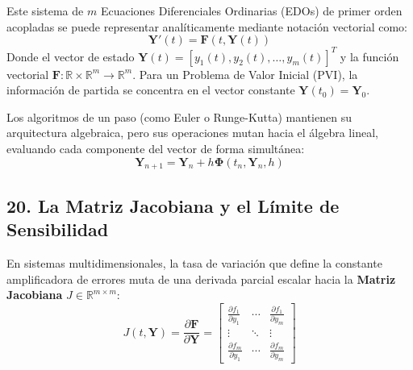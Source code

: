 \documentclass[12pt]{article}
\begin{document}
Este sistema de $m$ Ecuaciones Diferenciales Ordinarias (EDOs) de primer orden acopladas se puede representar analíticamente mediante notación vectorial como:
\begin{equation}
    \mathbf{Y}'(t) = \mathbf{F}(t, \textbf{Y}(t))
\end{equation}
Donde el vector de estado $\mathbf{Y}(t) = [y_1(t), y_2(t), \dots, y_m(t)]^T$ y la función vectorial $\mathbf{F}: \mathbb{R} \times \mathbb{R}^m \to \mathbb{R}^m$. Para un Problema de Valor Inicial (PVI), la información de partida se concentra en el vector constante $\mathbf{Y}(t_0) = \mathbf{Y}_0$.

Los algoritmos de un paso (como Euler o Runge-Kutta) mantienen su arquitectura algebraica, pero sus operaciones mutan hacia el álgebra lineal, evaluando cada componente del vector de forma simultánea:
\begin{equation}
    \mathbf{Y}_{n+1} = \mathbf{Y}_n + h \mathbf{\Phi}(t_n, \mathbf{Y}_n, h)
\end{equation}

\subsection*{20. La Matriz Jacobiana y el Límite de Sensibilidad}
En sistemas multidimensionales, la tasa de variación que define la constante amplificadora de errores muta de una derivada parcial escalar hacia la \textbf{Matriz Jacobiana} $J \in \mathbb{R}^{m \times m}$:
\begin{equation}
    J(t, \mathbf{Y}) = \frac{\partial \mathbf{F}}{\partial \mathbf{Y}} = 
    \begin{bmatrix}
        \frac{\partial f_1}{\partial y_1} & \cdots & \frac{\partial f_1}{\partial y_m} \\
        \vdots & \ddots & \vdots \\
        \frac{\partial f_m}{\partial y_1} & \cdots & \frac{\partial f_m}{\partial y_m}
    \end{bmatrix}
\end{equation}
\end{document}
